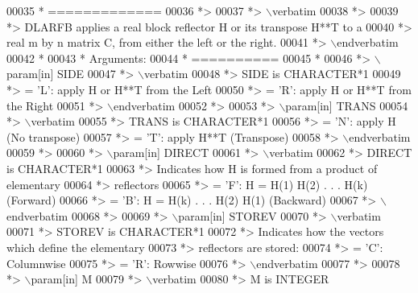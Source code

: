 \begin{DoxyCode}
00035 \textcolor{comment}{*  =============}
00036 \textcolor{comment}{*>}
00037 \textcolor{comment}{*> \(\backslash\)verbatim}
00038 \textcolor{comment}{*>}
00039 \textcolor{comment}{*> DLARFB applies a real block reflector H or its transpose H**T to a}
00040 \textcolor{comment}{*> real m by n matrix C, from either the left or the right.}
00041 \textcolor{comment}{*> \(\backslash\)endverbatim}
00042 \textcolor{comment}{*}
00043 \textcolor{comment}{*  Arguments:}
00044 \textcolor{comment}{*  ==========}
00045 \textcolor{comment}{*}
00046 \textcolor{comment}{*> \(\backslash\)param[in] SIDE}
00047 \textcolor{comment}{*> \(\backslash\)verbatim}
00048 \textcolor{comment}{*>          SIDE is CHARACTER*1}
00049 \textcolor{comment}{*>          = 'L': apply H or H**T from the Left}
00050 \textcolor{comment}{*>          = 'R': apply H or H**T from the Right}
00051 \textcolor{comment}{*> \(\backslash\)endverbatim}
00052 \textcolor{comment}{*>}
00053 \textcolor{comment}{*> \(\backslash\)param[in] TRANS}
00054 \textcolor{comment}{*> \(\backslash\)verbatim}
00055 \textcolor{comment}{*>          TRANS is CHARACTER*1}
00056 \textcolor{comment}{*>          = 'N': apply H (No transpose)}
00057 \textcolor{comment}{*>          = 'T': apply H**T (Transpose)}
00058 \textcolor{comment}{*> \(\backslash\)endverbatim}
00059 \textcolor{comment}{*>}
00060 \textcolor{comment}{*> \(\backslash\)param[in] DIRECT}
00061 \textcolor{comment}{*> \(\backslash\)verbatim}
00062 \textcolor{comment}{*>          DIRECT is CHARACTER*1}
00063 \textcolor{comment}{*>          Indicates how H is formed from a product of elementary}
00064 \textcolor{comment}{*>          reflectors}
00065 \textcolor{comment}{*>          = 'F': H = H(1) H(2) . . . H(k) (Forward)}
00066 \textcolor{comment}{*>          = 'B': H = H(k) . . . H(2) H(1) (Backward)}
00067 \textcolor{comment}{*> \(\backslash\)endverbatim}
00068 \textcolor{comment}{*>}
00069 \textcolor{comment}{*> \(\backslash\)param[in] STOREV}
00070 \textcolor{comment}{*> \(\backslash\)verbatim}
00071 \textcolor{comment}{*>          STOREV is CHARACTER*1}
00072 \textcolor{comment}{*>          Indicates how the vectors which define the elementary}
00073 \textcolor{comment}{*>          reflectors are stored:}
00074 \textcolor{comment}{*>          = 'C': Columnwise}
00075 \textcolor{comment}{*>          = 'R': Rowwise}
00076 \textcolor{comment}{*> \(\backslash\)endverbatim}
00077 \textcolor{comment}{*>}
00078 \textcolor{comment}{*> \(\backslash\)param[in] M}
00079 \textcolor{comment}{*> \(\backslash\)verbatim}
00080 \textcolor{comment}{*>          M is INTEGER}

\end{DoxyCode}
